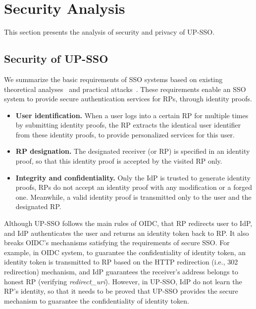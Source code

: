 \section{Security Analysis}
\label{sec:analysis}
This section presents the analysis of security and privacy of UP-SSO. 

\subsection{Security of UP-SSO}
We summarize the basic requirements of SSO systems based on existing theoretical analyses~\cite{ArmandoCCCT08,FettKS16, FettKS17} and practical attacks~\cite{SomorovskyMSKJ12,WangCW12,ArmandoCCCPS13,ZhouE14,WangZLLYLG15,WangZLG16,YangLLZH16,MainkaMS16,MohsenS16,MainkaMSW17,YangLCZ18,YangLS17,ShiWL19}. These requirements enable an SSO system to provide secure authentication services for RPs,
    through identity proofs.
\begin{itemize}
\item
\textbf{User identification.} When a user logs into a certain RP for multiple times by submitting identity proofs,
 the RP extracts the identical user identifier from these identity proofs,
    to provide personalized services for this user.

\item
\textbf{RP designation.} The designated receiver (or RP) is specified in an identity proof,
    so that this identity proof is accepted by the visited RP only.

\item
\textbf{Integrity and confidentiality.}
 Only the IdP is trusted to generate identity proofs,
 RPs do not accept an identity proof with any modification or a forged one.
Meanwhile, a valid identity proof is transmitted only to the user and the designated RP.
\end{itemize}

Although UP-SSO follows the main rules of OIDC, that RP redirects user to IdP, and IdP authenticates the user and returns an identity token back to RP. It also breaks OIDC's mechanisms satisfying the requirements of secure SSO. For example, in OIDC system, to guarantee the confidentiality of identity token, an identity token is transmitted to RP based on the HTTP redirection (i.e., 302 redirection) mechanism, and IdP guarantees the receiver's address belongs to honest RP (verifying \emph{redirect\_uri}). However, in UP-SSO, IdP do not learn the RP's identity, so that it needs to be proved that UP-SSO provides the secure mechanism to guarantee the confidentiality of identity token.

